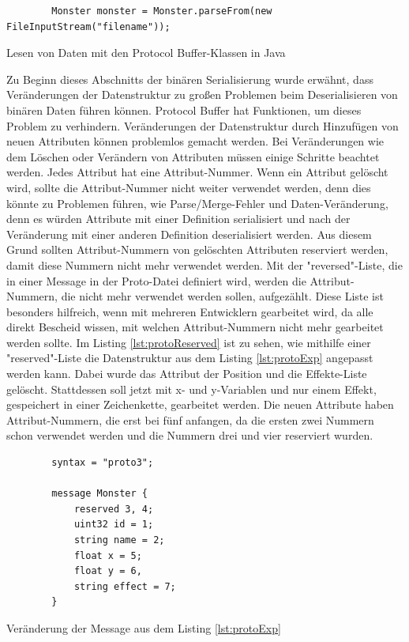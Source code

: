 \begin{listing}[htp]
    \begin{verbatim} 
        Monster monster = Monster.parseFrom(new FileInputStream("filename"));
    \end{verbatim}
    \caption{Lesen von Daten mit den Protocol Buffer-Klassen in Java}
    \label{lst:protobufJavaRead}
\end{listing}

Zu Beginn dieses Abschnitts der binären Serialisierung wurde erwähnt, dass Veränderungen der Datenstruktur zu großen Problemen beim Deserialisieren von binären Daten führen können. Protocol Buffer hat Funktionen, um dieses Problem zu verhindern. Veränderungen der Datenstruktur durch Hinzufügen von neuen Attributen können problemlos gemacht werden. Bei Veränderungen wie dem Löschen oder Verändern von Attributen müssen einige Schritte beachtet werden. Jedes Attribut hat eine Attribut-Nummer. Wenn ein Attribut gelöscht wird, sollte die Attribut-Nummer nicht weiter verwendet werden, denn dies könnte zu Problemen führen, wie Parse/Merge-Fehler und Daten-Veränderung, denn es würden Attribute mit einer Definition serialisiert und nach der Veränderung mit einer anderen Definition deserialisiert werden. Aus diesem Grund sollten Attribut-Nummern von gelöschten Attributen reserviert werden, damit diese Nummern nicht mehr verwendet werden. Mit der "reversed"-Liste, die in einer Message in der Proto-Datei definiert wird, werden die Attribut-Nummern, die nicht mehr verwendet werden sollen, aufgezählt. Diese Liste ist besonders hilfreich, wenn mit mehreren Entwicklern gearbeitet wird, da alle direkt Bescheid wissen, mit welchen Attribut-Nummern nicht mehr gearbeitet werden sollte. Im Listing \ref{lst:protoReserved} ist zu sehen, wie mithilfe einer "reserved"-Liste die Datenstruktur aus dem Listing \ref{lst:protoExp} angepasst werden kann. Dabei wurde das Attribut der Position und die Effekte-Liste gelöscht. Stattdessen soll jetzt mit x- und y-Variablen und nur einem Effekt, gespeichert in einer Zeichenkette, gearbeitet werden. Die neuen Attribute haben Attribut-Nummern, die erst bei fünf anfangen, da die ersten zwei Nummern schon verwendet werden und die Nummern drei und vier reserviert wurden.\cite{protobufLanguageGuide}

\begin{listing}[htp]
    \begin{verbatim} 
        syntax = "proto3";
        
        message Monster {
            reserved 3, 4; 
            uint32 id = 1;
            string name = 2;
            float x = 5;
            float y = 6,
            string effect = 7;
        }
    \end{verbatim}
    \caption{Veränderung der Message aus dem Listing \ref{lst:protoExp}}
    \label{lst:protoReserved}
\end{listing}


